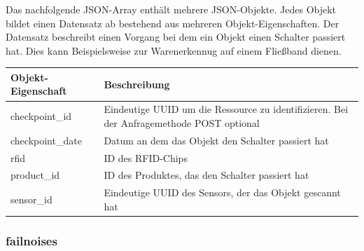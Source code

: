 Das nachfolgende JSON-Array enthält mehrere JSON-Objekte. Jedes Objekt bildet
einen Datensatz ab bestehend aus mehreren Objekt-Eigenschaften. Der Datensatz
beschreibt einen Vorgang bei dem ein Objekt einen Schalter passiert hat. Dies
kann Beispielsweise zur Warenerkennug auf einem Fließband dienen.

\begin{jsoncode}
\end{jsoncode}

\begin{table}[H]
  \begin{tabularx}{\textwidth}{lX}
    \textbf{Objekt-Eigenschaft} & \textbf{Beschreibung}                                                                     \\ \toprule
    checkpoint\_id              & Eindeutige UUID um die Ressource zu identifizieren. Bei der Anfragemethode POST optional  \\
    checkpoint\_date            & Datum an dem das Objekt den Schalter passiert hat                                         \\
    rfid                        & ID des RFID-Chips                                                                         \\
    product\_id                 & ID des Produktes, das den Schalter passiert hat                                           \\
    sensor\_id                  & Eindeutige UUID des Sensors, der das Objekt gescannt hat                                  \\
  \end{tabularx}
\end{table}

\subsubsection{failnoises}%
\label{sec:rest.json.failnoises}

